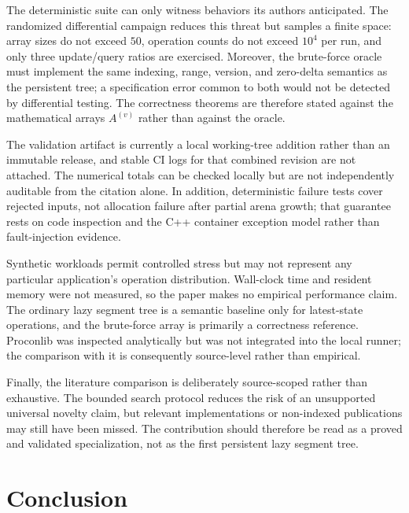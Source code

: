 \documentclass[conference]{IEEEtran}
\begin{document}
The deterministic suite can only witness behaviors its authors anticipated. The randomized
differential campaign reduces this threat but samples a finite space: array sizes do not exceed
$50$, operation counts do not exceed $10^4$ per run, and only three update/query ratios are
exercised. Moreover, the brute-force oracle must implement the same
indexing, range, version, and zero-delta semantics as the persistent tree; a specification error
common to both would not be detected by differential testing. The correctness theorems are
therefore stated against the mathematical arrays $A^{(v)}$ rather than against the oracle.

The validation artifact is currently a local working-tree addition rather than an immutable
release, and stable CI logs for that combined revision are not attached. The numerical totals can
be checked locally but are not independently auditable from the citation alone. In addition,
deterministic failure tests cover rejected inputs, not allocation failure after partial arena
growth; that guarantee rests on code inspection and the C++ container exception model rather than
fault-injection evidence.

Synthetic workloads permit controlled stress but may not represent any particular application's
operation distribution. Wall-clock time and resident memory were not measured, so the paper makes
no empirical performance claim. The ordinary lazy segment tree is a semantic baseline only for
latest-state operations, and the brute-force array is primarily a correctness reference.
Proconlib was inspected analytically but was not integrated into the local runner; the comparison
with it is consequently source-level rather than empirical.

Finally, the literature comparison is deliberately source-scoped rather than exhaustive. The
bounded search protocol reduces the risk of an unsupported universal novelty claim, but relevant
implementations or non-indexed publications may still have been missed. The contribution should
therefore be read as a proved and validated specialization, not as the first persistent lazy
segment tree.

\section{Conclusion}
\label{sec:conclusion}
\end{document}
